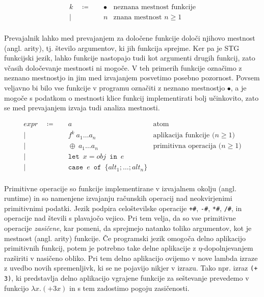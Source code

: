 \begin{align*}
	k \quad \coloneq& \quad \bullet & \text{neznana mestnost funkcije}\\
	\vert& \quad n & \text{znana mestnost $n \geq 1$}\\
\end{align*}

Prevajalnik lahko med prevajanjem za določene funkcije določi njihovo mestnost (angl. arity), tj. število argumentov, ki jih funkcija sprejme. Ker pa je STG funkcijski jezik, lahko funkcije nastopajo tudi kot argumenti drugih funkcij, zato včasih določevanje mestnosti ni mogoče. V teh primerih funkcije označimo z neznano mestnostjo in jim med izvajanjem posvetimo posebno pozornost. Povsem veljavno bi bilo vse funkcije v programu označiti z neznano mestnostjo $\bullet$, a je mogoče s podatkom o mestnosti klice funkcij implementirati bolj učinkovito, zato se med prevajanjem izvaja tudi analiza mestnosti.

\begin{align*}
	expr \quad \coloneq& \quad a & \text{atom}\\
	\vert& \quad f^k \: a_1 \dots a_n & \text{aplikacija funkcije ($n \geq 1$)}\\
	\vert& \quad \oplus \: a_1 \dots a_n & \text{primitivna operacija ($n \geq 1$)}\\
	\vert& \quad \texttt{let} \enspace x = obj \enspace \texttt{in} \enspace e & \text{} \\
	\vert& \quad \texttt{case} \enspace e \enspace \texttt{of} \enspace \{ alt_1; \dots; alt_n \}& \text{} \\
\end{align*}

Primitivne operacije so funkcije implementirane v izvajalnem okolju (angl. runtime) in so namenjene izvajanju računskih operacij nad neokvirjenimi primitivnimi podatki. Jezik podpira celoštevilske operacije \texttt{+\#}, \texttt{-\#}, \texttt{*\#}, \texttt{/\#}, in operacije nad števili s plavajočo vejico. Pri tem velja, da so vse primitivne operacije \textit{zasičene}, kar pomeni, da sprejmejo natanko toliko argumentov, kot je mestnost (angl. arity) funkcije. Če programski jezik omogoča delno aplikacijo primitivnih funkcij, potem je potrebno take delne aplikacije z $\eta$-dopolnjevanjem razširiti v nasičeno obliko. Pri tem delno aplikacijo ovijemo v nove lambda izraze z uvedbo novih spremenljivk, ki se ne pojavijo nikjer v izrazu. Tako npr. izraz \texttt{(+ 3)}, ki predstavlja delno aplikacijo vgrajene funkcije za seštevanje prevedemo v funkcijo $\lambda x . (+ 3 x)$ in s tem zadostimo pogoju zasičenosti.

